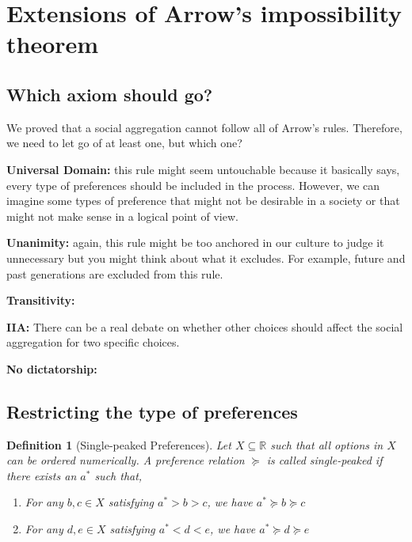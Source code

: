 \documentclass[12pt]{report}
\newtheorem{definition}{Definition}[chapter]
\begin{document}
\section{Extensions of Arrow's impossibility theorem}

\subsection{Which axiom should go?} 

We proved that a social aggregation cannot follow all of Arrow's rules. Therefore, we need to let go of at least one, but which one?

\textbf{Universal Domain:} this rule might seem untouchable because it basically says, every type of preferences should be included in the process. However, we can imagine some types of preference that might not be desirable in a society or that might not make sense in a logical point of view.

\textbf{Unanimity:} again, this rule might be too anchored in our culture to judge it unnecessary but you might think about what it excludes. For example, future and past generations are excluded from this rule.

\textbf{Transitivity:}

\textbf{IIA:} There can be a real debate on whether other choices should affect the social aggregation for two specific choices.

\textbf{No dictatorship:}

\subsection{Restricting the type of preferences}

\begin{definition}[Single-peaked Preferences]
Let $X\subseteq\mathbb{R}$ such that all options in $X$ can be ordered numerically. A preference relation $\succeq$ is called single-peaked if there exists an $a^*$ such that,\begin{enumerate}
\item For any $b,c\in X$ satisfying $a^*>b>c$, we have $a^*\succeq b\succeq c$
\item For any $d,e\in X$ satisfying $a^*<d<e$, we have $a^*\succeq d\succeq e$
\end{enumerate}
\end{definition}
\end{document}
